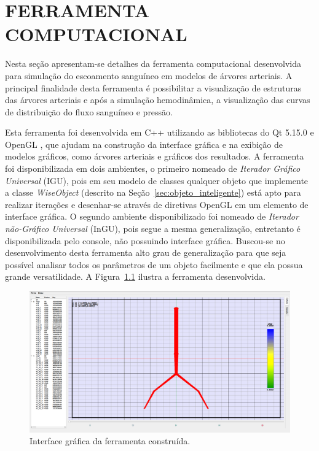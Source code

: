 \chapter{FERRAMENTA COMPUTACIONAL}\label{sec:ferramenta_computacional}

Nesta seção apresentam-se detalhes da ferramenta computacional desenvolvida para simulação do escoamento sanguíneo em modelos de árvores arteriais. A principal finalidade desta ferramenta é possibilitar a visualização de estruturas das árvores arteriais e após a simulação hemodinâmica,  a visualização das curvas de distribuição do fluxo sanguíneo e pressão.

Esta ferramenta foi desenvolvida em C++ utilizando as bibliotecas do Qt 5.15.0 \cite{QTClasses} e OpenGL \cite{OpenGL}, que ajudam na construção da interface gráfica e na exibição de modelos gráficos, como árvores arteriais e gráficos dos resultados. A ferramenta foi disponibilizada em dois ambientes, o primeiro nomeado de \textit{Iterador Gráfico Universal} (IGU), pois em seu modelo de classes qualquer objeto que implemente a classe \textit{WiseObject} (descrito na Seção~\ref{sec:objeto_inteligente}) está apto para realizar iterações e desenhar-se através de diretivas OpenGL em um elemento de interface gráfica. O segundo ambiente disponibilizado foi nomeado de \textit{Iterador não-Gráfico Universal} (InGU), pois segue a mesma generalização, entretanto é disponibilizada pelo console, não possuindo interface gráfica. Buscou-se no desenvolvimento desta ferramenta alto grau de generalização para que seja possível analisar todos os parâmetros de um objeto facilmente e que ela possua grande versatilidade.  A Figura~\ref{fig1:gui} ilustra a ferramenta desenvolvida.

\begin{figure}[!htbp]
	\centering
	\includegraphics[scale=0.25]{Figures/IGU_002.png}
	\caption{Interface gráfica da ferramenta construída.}
	\label{fig1:gui}
\end{figure}

